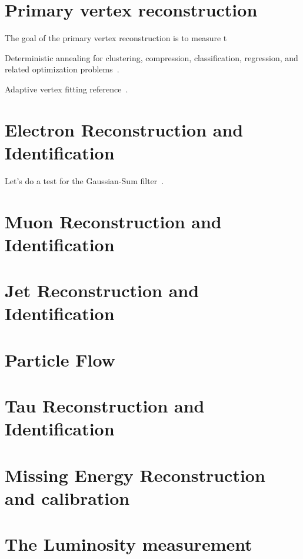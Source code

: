 \section{Primary vertex reconstruction}

The goal of the primary vertex reconstruction is to measure t

Deterministic annealing for clustering, compression, classification, regression, and related optimization problems~\cite{726788}.

Adaptive vertex fitting reference~\cite{0954-3899-34-12-N01}.

\section{Electron Reconstruction and Identification}

Let's do a test for the Gaussian-Sum filter~\cite{Adam:815410}.

\section{Muon Reconstruction and Identification}

\section{Jet Reconstruction and Identification}

\section{Particle Flow}

\section{Tau Reconstruction and Identification}

\section{Missing Energy Reconstruction and calibration}
    
\section{The Luminosity measurement }

